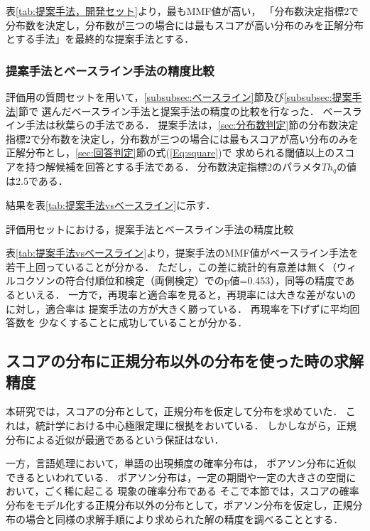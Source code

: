 \documentclass[japanese]{jnlp_1.4}
\begin{document}
表\ref{tab:提案手法，開発セット}より，最もMMF値が高い，
「分布数決定指標2で分布数を決定し，分布数が三つの場合には最もスコアが高い分布のみを正解分布とする手法」を最終的な提案手法とする． 


\subsubsection{提案手法とベースライン手法の精度比較}

評価用の質問セットを用いて，\ref{subsubsec:ベースライン}節及び\ref{subsubsec:提案手法}節で
\pagebreak
選んだベースライン手法と提案手法の精度の比較を行なった．
ベースライン手法は秋葉らの手法\cite{秋葉:質問応答における常識的な解の選択と期待効用に基づく回答群の決定}である．
提案手法は，\ref{sec:分布数判定}節の分布数決定指標2で分布数を決定し，分布数が三つの場合には最もスコアが高い分布のみを正解分布とし，\ref{sec:回答判定}節の式(\ref{Eq:square})で
求められる閾値以上のスコアを持つ解候補を回答とする手法である．
分布数決定指標2のパラメタ$Th_q$の値は2.5である．

結果を表\ref{tab:提案手法vsベースライン}に示す．

\begin{table}[b]
\caption{評価用セットにおける，提案手法とベースライン手法の精度比較}
\label{tab:提案手法vsベースライン}
\begin{center}

\end{center}
\end{table}


表\ref{tab:提案手法vsベースライン}より，提案手法のMMF値がベースライン手法を若干上回っていることが分かる．
ただし，この差に統計的有意差は無く（ウィルコクソンの符合付順位和検定（両側検定）でのp値=0.453），同等の精度であるといえる．
一方で，再現率と適合率を見ると，再現率には大きな差がないのに対し，適合率は
提案手法の方が大きく勝っている．
再現率を下げずに平均回答数を
少なくすることに成功していることが分かる．


\subsection{スコアの分布に正規分布以外の分布を使った時の求解精度}\label{sec:他の分布}

本研究では，スコアの分布として，正規分布を仮定して分布を求めていた．
これは，統計学における中心極限定理に根拠をおいている．
しかしながら，正規分布による近似が最適であるという保証はない．

一方，言語処理において，単語の出現頻度の確率分布は，
ポアソン分布に近似できるといわれている．
ポアソン分布は，一定の期間や一定の大きさの空間において，ごく稀に起こる
現象の確率分布である
そこで本節では，スコアの確率分布をモデル化する正規分布以外の分布として，ポアソン分布を仮定し，正規分布の場合と同様の求解手順により求められた解の精度を調べることとする．
\end{document}
